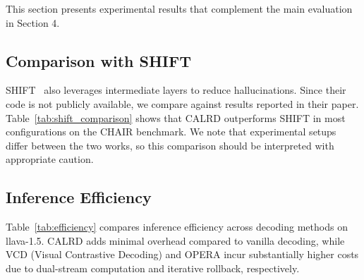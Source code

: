 \documentclass{article}
\newif\ifshowrevisions
\newenvironment{revised}{%
  \ifshowrevisions%
  \fi%
}{}
\begin{document}
\begin{revised}
This section presents experimental results that complement the main evaluation in Section 4.

\subsection{Comparison with SHIFT}

SHIFT~\cite{wang2025shift} also leverages intermediate layers to reduce hallucinations. Since their code is not publicly available, we compare against results reported in their paper. Table~\ref{tab:shift_comparison} shows that CALRD outperforms SHIFT in most configurations on the CHAIR benchmark. We note that experimental setups differ between the two works, so this comparison should be interpreted with appropriate caution.

\subsection{Inference Efficiency}

Table~\ref{tab:efficiency} compares inference efficiency across decoding methods on llava-1.5. CALRD adds minimal overhead compared to vanilla decoding, while VCD (Visual Contrastive Decoding) and OPERA incur substantially higher costs due to dual-stream computation and iterative rollback, respectively.

\begin{table}[h]
\centering
\caption{Inference efficiency comparison on LLaVA-1.5 (single H100 GPU).}
\label{tab:efficiency}
\end{table}





\end{revised}
\end{document}
